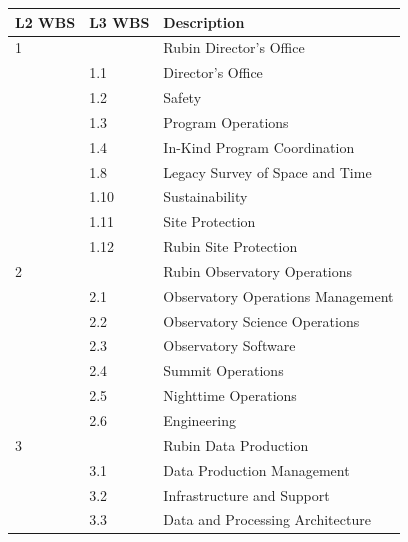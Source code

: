 \begin{longtable}[]{@{}lll@{}}

\hline
L2 \gls{WBS} & \gls{L3} \gls{WBS} & Description \tabularnewline
\hline
\endhead

1 & & Rubin \gls{Director}'s Office  \tabularnewline
  & 1.1 & \hspace{0.5cm} \gls{Director}'s Office  \tabularnewline
  & 1.2 & \hspace{0.5cm} \gls{Safety}  \tabularnewline
  & 1.3 & \hspace{0.5cm} Program \gls{Operations}\footnotemark[1]  \tabularnewline
  & 1.4 & \hspace{0.5cm} In-Kind Program Coordination  \tabularnewline
  & 1.8 & \hspace{0.5cm} Legacy Survey of Space and Time  \tabularnewline
  & 1.10 & \hspace{0.5cm} Sustainability  \tabularnewline
  & 1.11 & \hspace{0.5cm} Site Protection  \tabularnewline
  & 1.12 & \hspace{0.5cm} Rubin Site Protection  \tabularnewline
2 & & Rubin Observatory \gls{Operations}  \tabularnewline
  & 2.1 & \hspace{0.5cm} Observatory \gls{Operations} Management  \tabularnewline
  & 2.2 & \hspace{0.5cm} Observatory Science \gls{Operations}  \tabularnewline
  & 2.3 & \hspace{0.5cm} Observatory Software  \tabularnewline
  & 2.4 & \hspace{0.5cm} \gls{Summit} \gls{Operations}  \tabularnewline
  & 2.5 & \hspace{0.5cm} Nighttime \gls{Operations}  \tabularnewline
  & 2.6 & \hspace{0.5cm} Engineering  \tabularnewline
3 & & Rubin Data Production \tabularnewline
  & 3.1 & \hspace{0.5cm} Data Production Management  \tabularnewline
  & 3.2 & \hspace{0.5cm} Infrastructure and Support  \tabularnewline
  & 3.3 & \hspace{0.5cm} Data and Processing Architecture  \tabularnewline

\end{longtable}
